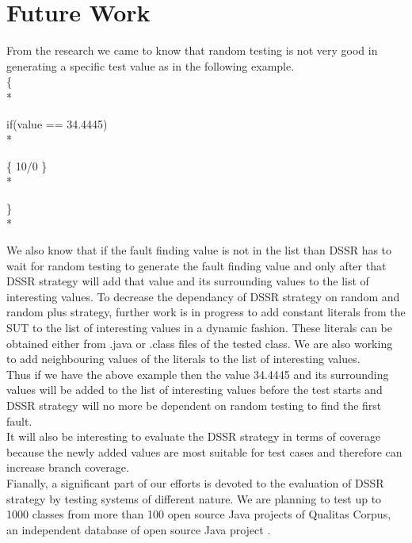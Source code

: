 \section{Future Work}

From the research we came to know that random testing is not very good in generating a specific test value as in the following example.  \\

\{ \\*   

\hspace{07 mm}if(value == 34.4445) \\*

\hspace{07 mm}\{ 10/0 \} \\* 

\} \\*


We also know that if the fault finding value is not in the list than DSSR has to wait for random testing to generate the fault finding value and only after that DSSR strategy will add that value and its surrounding values to the list of interesting values. To decrease the dependancy of DSSR strategy on random and random plus strategy, further work is in progress to add constant literals from the SUT to the list of interesting values in a dynamic fashion. These literals can be obtained either from .java or .class files of the tested class. We are also working to add  neighbouring values of the literals to the list of interesting values. \\

Thus if we have the above example then the value 34.4445 and its surrounding values will be added to the list of interesting values before the test starts and DSSR strategy will no more be dependent on random testing to find the first fault.\\

It will also be interesting to evaluate the DSSR strategy in terms of coverage because the newly added values are most suitable for test cases and therefore can increase branch coverage. \\

Fianally, a significant part of our efforts is devoted to the evaluation of DSSR strategy by testing systems of different nature. We are planning to test up to 1000 classes from more than 100 open source Java projects of Qualitas Corpus, an independent database of open source Java project \cite{Tempero2010}. \\
